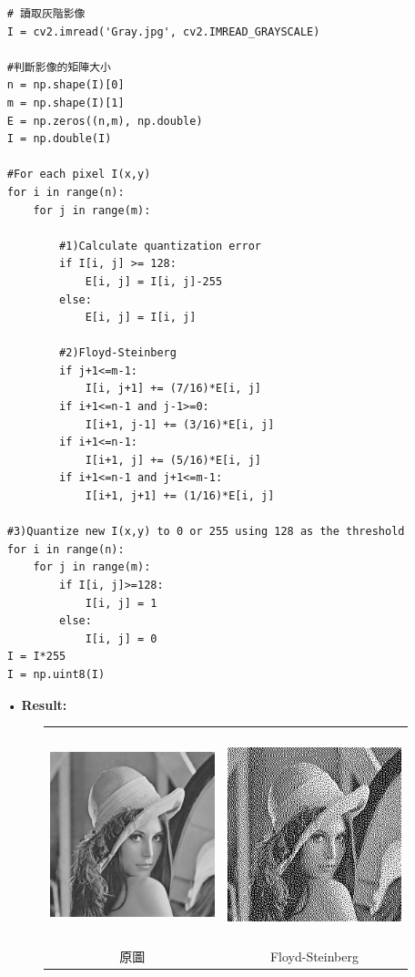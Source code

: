 \documentclass[12pt,a4paper]{article}
\begin{document}
\begin{enumerate}
\begin{lstlisting}
# 讀取灰階影像
I = cv2.imread('Gray.jpg', cv2.IMREAD_GRAYSCALE)

#判斷影像的矩陣大小
n = np.shape(I)[0]
m = np.shape(I)[1]
E = np.zeros((n,m), np.double)
I = np.double(I)

#For each pixel I(x,y)
for i in range(n):
    for j in range(m):
        
        #1)Calculate quantization error
        if I[i, j] >= 128:
            E[i, j] = I[i, j]-255
        else:
            E[i, j] = I[i, j]
            
        #2)Floyd-Steinberg    
        if j+1<=m-1:
            I[i, j+1] += (7/16)*E[i, j]
        if i+1<=n-1 and j-1>=0:
            I[i+1, j-1] += (3/16)*E[i, j]
        if i+1<=n-1:
            I[i+1, j] += (5/16)*E[i, j]
        if i+1<=n-1 and j+1<=m-1:
            I[i+1, j+1] += (1/16)*E[i, j]

#3)Quantize new I(x,y) to 0 or 255 using 128 as the threshold
for i in range(n):
    for j in range(m):
        if I[i, j]>=128:
            I[i, j] = 1
        else:
            I[i, j] = 0
I = I*255           
I = np.uint8(I)

\end{lstlisting}

\item[•]
{\bf Result:}
\begin{figure}[h]
\hspace*{3em}
\begin{tabular}{cc}
\includegraphics[height=2.4in]{Gray.jpg}&
\includegraphics[height=2.4in]{Floyd-Steinberg.jpg}\\
原圖  & Floyd-Steinberg
\end{tabular}
\end{figure} 


\end{enumerate}
\end{document}
